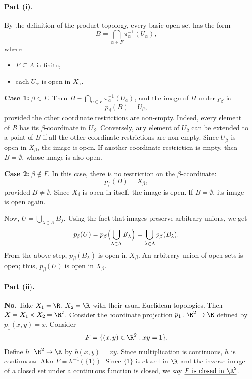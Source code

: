 
\paragraph{Part (i).}
By the definition of the product topology, every basic open set has the form
\[ B=\bigcap_{\alpha\in F}\pi_\alpha^{-1}(U_\alpha), \]
where
\begin{itemize}
  \item $F\subseteq A$ is finite,
  \item each $U_\alpha$ is open in $X_\alpha$.
\end{itemize}

\textbf{Case 1:} $\beta\in F$. Then $B=\bigcap_{\alpha\in F}\pi_\alpha^{-1}(U_\alpha)$, and the
image of $B$ under $p_\beta$ is
\[ p_\beta(B)=U_\beta, \]
provided the other coordinate restrictions are non-empty. Indeed, every element of $B$ has its
$\beta$-coordinate in $U_\beta$. Conversely, any element of $U_\beta$ can be extended to a
point of $B$ if all the other coordinate restrictions are non-empty. Since $U_\beta$ is open in
$X_\beta$, the image is open. If another coordinate restriction is empty, then $B=\emptyset$,
whose image is also open.

\textbf{Case 2:} $\beta\notin F$. In this case, there is no restriction on the
$\beta$-coordinate:
\[ p_\beta(B)=X_\beta, \]
provided $B\neq\emptyset$. Since $X_\beta$ is open in itself, the image is open. If
$B=\emptyset$, its image is open again.

Now, $U=\bigcup_{\lambda\in\Lambda}B_\lambda$. Using the fact that images preserve arbitrary
unions, we get
\[ p_\beta(U)=p_\beta\Bigl(\bigcup_{\lambda\in\Lambda}B_\lambda\Bigr)
             =\bigcup_{\lambda\in\Lambda}p_\beta(B_\lambda). \]
From the above step, $p_\beta(B_\lambda)$ is open in $X_\beta$. An arbitrary union of open sets
is open; thus, $p_\beta(U)$ is open in $X_\beta$.

\paragraph{Part (ii).} \textbf{No.}
Take $X_1=\R$, $X_2=\R$ with their usual Euclidean topologies. Then $X=X_1\times X_2=\R^2$.
Consider the coordinate projection $p_1\colon\R^2\to\R$ defined by $p_1(x,y)=x$. Consider
\[ F=\{(x,y)\in\R^2 : xy=1\}. \]
Define $h\colon\R^2\to\R$ by $h(x,y)=xy$. Since multiplication is continuous, $h$ is continuous.
Also $F=h^{-1}(\{1\})$. Since $\{1\}$ is closed in $\R$ and the inverse image of a closed set
under a continuous function is closed, we say $\underline{F \text{ is closed in } \R^2}$.


